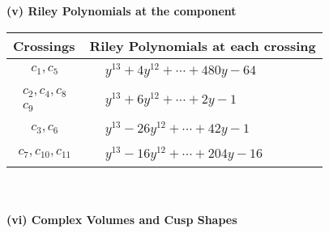 \documentclass[1p]{elsarticle_modified}
\theoremstyle{definition}
\begin{document}
\newpage\renewcommand{\arraystretch}{1}
\flushleft \textbf{(v) Riley Polynomials at the component}\newline \\
\begin{tabular}{m{50pt}|m{274pt}}
Crossings & \hspace{64pt}Riley Polynomials at each crossing \\
\hline $$\begin{aligned}c_{1},c_{5}\end{aligned}$$&$\begin{aligned}
&y^{13}+4 y^{12}+\cdots+480 y-64
\end{aligned}$\\
\hline $$\begin{aligned}c_{2},c_{4},c_{8}\\c_{9}\end{aligned}$$&$\begin{aligned}
&y^{13}+6 y^{12}+\cdots+2 y-1
\end{aligned}$\\
\hline $$\begin{aligned}c_{3},c_{6}\end{aligned}$$&$\begin{aligned}
&y^{13}-26 y^{12}+\cdots+42 y-1
\end{aligned}$\\
\hline $$\begin{aligned}c_{7},c_{10},c_{11}\end{aligned}$$&$\begin{aligned}
&y^{13}-16 y^{12}+\cdots+204 y-16
\end{aligned}$\\
\hline
\end{tabular}\\~\\
\newpage\flushleft \textbf{(vi) Complex Volumes and Cusp Shapes}
\end{document}
